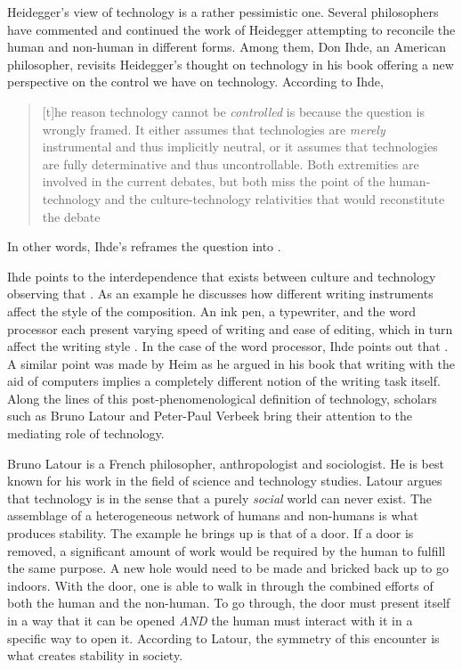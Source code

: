 Heidegger's view of technology is a rather pessimistic one. Several philosophers have commented and continued the work of Heidegger attempting to reconcile the human and non-human in different forms. Among them, Don Ihde, an American philosopher, revisits Heidegger's thought on technology in his book  \citeyearpar{Ihde1990} offering a new perspective on the control we have on technology. According to Ihde, \blockcquote[p. 140]{Ihde1990}{[t]he reason technology cannot be \emph{controlled} is because the question is wrongly framed. It either assumes that technologies are \emph{merely} instrumental and thus implicitly neutral, or it assumes that technologies are fully determinative and thus uncontrollable. Both extremities are involved in the current debates, but both miss the point of the human-technology and the culture-technology relativities that would reconstitute the debate}. In other words, Ihde's reframes the question  into .

Ihde points to the interdependence that exists between culture and technology observing that . As an example he discusses how different writing instruments affect the style of the composition. An ink pen, a typewriter, and the word processor each present varying speed of writing and ease of editing, which in turn affect the writing style \citep[p. 142]{Ihde1990}. In the case of the word processor, Ihde points out that . A similar point was made by Heim \citeyearpar{Heim1999} as he argued in his book  that writing with the aid of computers implies a completely different notion of the writing task itself. Along the lines of this post-phenomenological definition of technology, scholars such as Bruno Latour and Peter-Paul Verbeek bring their attention to the mediating role of technology. 

Bruno Latour is a French philosopher, anthropologist and sociologist. He is best known for his work in the field of science and technology studies. Latour argues that technology is  \citep{Latour1990} in the sense that a purely \emph{social} world can never exist. The assemblage of a heterogeneous network of humans and non-humans is what produces stability. The example he brings up is that of a door. If a door is removed, a significant amount of work would be required by the human to fulfill the same purpose. A new hole would need to be made and bricked back up to go indoors. With the door, one is able to walk in through the combined efforts of both the human and the non-human. To go through, the door must present itself in a way that it can be opened \emph{AND} the human must interact with it in a specific way to open it. According to Latour, the symmetry of this encounter is what creates stability in society.


